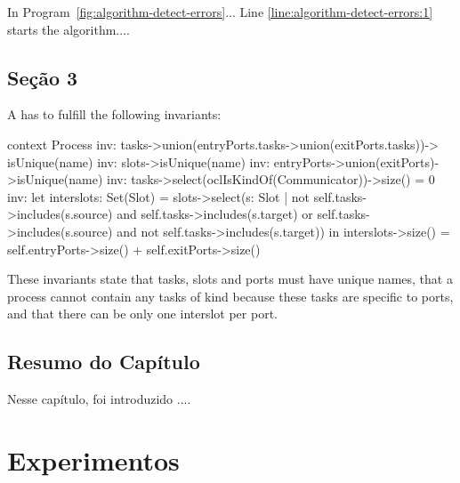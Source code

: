 \documentclass[final]{rc-book-2.14}
\begin{document}
In Program~\ref{fig:algorithm-detect-errors}... Line \ref{line:algorithm-detect-errors:1} starts the algorithm....
 
\section{Seção 3}
\label{sec:approach:section-3}

A  has to fulfill the following invariants:

\begin{listing}
context Process
    inv: tasks->union(entryPorts.tasks->union(exitPorts.tasks))->
            isUnique(name)
    inv: slots->isUnique(name)
    inv: entryPorts->union(exitPorts)->isUnique(name)
    inv: tasks->select(oclIsKindOf(Communicator))->size() = 0
    inv: let interslots: Set(Slot) = slots->select(s: Slot |
            not self.tasks->includes(s.source) and
            self.tasks->includes(s.target) or
            self.tasks->includes(s.source) and
            not self.tasks->includes(s.target)) in
            interslots->size() = self.entryPorts->size() +
                                 self.exitPorts->size()
\end{listing}

These invariants state that tasks, slots and ports must have unique names, that a process cannot contain any tasks of kind  because these tasks are specific to ports, and that there can be only one interslot per port.

\section{Resumo do Capítulo}
\label{sec:approach:summary}

Nesse capítulo, foi introduzido .... 





\chapter{Experimentos}
\label{chp:experiments}
\end{document}
